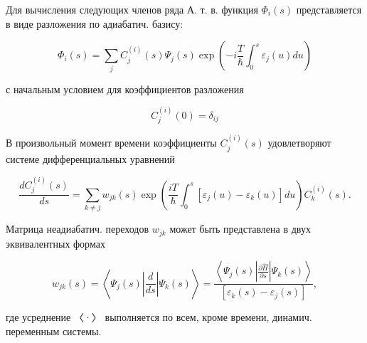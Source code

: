 \documentclass[10pt]{article}
\begin{document}
Для вычисления следующих членов ряда А. т. в. функция $\Phi_{i}(s)$ представляется в виде разложения по адиабатич. базису:



\[

\Phi_{i}(s)=\sum_{j} C_{j}^{(i)}(s) \Psi_{j}(s) \exp \left(-i \frac{T}{\hbar} \int_{0}^{s} \varepsilon_{j}(u) d u\right)

\]



с начальным условием для коэффициентов разложения



\[

C_{j}^{(i)}(0)=\delta_{i j}

\]



В произвольный момент времени коэффициенты $C_{j}^{(i)}(s)$ удовлетворяют системе дифференциальных уравнений



\[

\frac{d C_{j}^{(i)}(s)}{d s}=\sum_{k \neq j} w_{j k}(s) \exp \left(\frac{i T}{\hbar} \int_{0}^{s}\left[\varepsilon_{j}(u)-\varepsilon_{k}(u)\right] d u\right) C_{k}^{(i)}(s) .

\]



Матрица неадиабатич. переходов $w_{j k}$ может быть представлена в двух эквивалентных формах



\[

w_{j k}(s)=\left\langle\Psi_{j}(s)\left|\frac{d}{d s}\right| \Psi_{k}(s)\right\rangle=\frac{\left\langle\Psi_{j}(s)\left|\frac{\partial \hat{H}}{\partial s}\right| \Psi_{k}(s)\right\rangle}{\left[\varepsilon_{k}(s)-\varepsilon_{j}(s)\right]},

\]



где усреднение 〈·〉 выполняется по всем, кроме времени, динамич. переменным системы.
\end{document}
